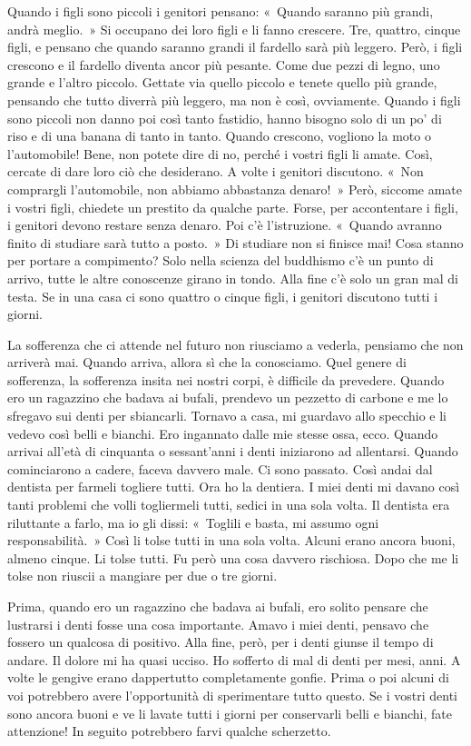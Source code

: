 Quando i figli sono piccoli i genitori pensano: «~Quando saranno più
grandi, andrà meglio.~» Si occupano dei loro figli e li fanno crescere.
Tre, quattro, cinque figli, e pensano che quando saranno grandi il
fardello sarà più leggero. Però, i figli crescono e il fardello diventa
ancor più pesante. Come due pezzi di legno, uno grande e l'altro
piccolo. Gettate via quello piccolo e tenete quello più grande, pensando
che tutto diverrà più leggero, ma non è così, ovviamente. Quando i figli
sono piccoli non danno poi così tanto fastidio, hanno bisogno solo di un
po' di riso e di una banana di tanto in tanto. Quando crescono, vogliono
la moto o l'automobile! Bene, non potete dire di no, perché i vostri
figli li amate. Così, cercate di dare loro ciò che desiderano. A volte i
genitori discutono. «~Non comprargli l'automobile, non abbiamo
abbastanza denaro!~» Però, siccome amate i vostri figli, chiedete un
prestito da qualche parte. Forse, per accontentare i figli, i genitori
devono restare senza denaro. Poi c'è l'istruzione. «~Quando avranno
finito di studiare sarà tutto a posto.~» Di studiare non si finisce mai!
Cosa stanno per portare a compimento? Solo nella scienza del buddhismo
c'è un punto di arrivo, tutte le altre conoscenze girano in tondo. Alla
fine c'è solo un gran mal di testa. Se in una casa ci sono quattro o
cinque figli, i genitori discutono tutti i giorni.

La sofferenza che ci attende nel futuro non riusciamo a vederla,
pensiamo che non arriverà mai. Quando arriva, allora sì che la
conosciamo. Quel genere di sofferenza, la sofferenza insita nei nostri
corpi, è difficile da prevedere. Quando ero un ragazzino che badava ai
bufali, prendevo un pezzetto di carbone e me lo sfregavo sui denti per
sbiancarli. Tornavo a casa, mi guardavo allo specchio e li vedevo così
belli e bianchi. Ero ingannato dalle mie stesse ossa, ecco. Quando
arrivai all'età di cinquanta o sessant'anni i denti iniziarono ad
allentarsi. Quando cominciarono a cadere, faceva davvero male. Ci sono
passato. Così andai dal dentista per farmeli togliere tutti. Ora ho la
dentiera. I miei denti mi davano così tanti problemi che volli
togliermeli tutti, sedici in una sola volta. Il dentista era riluttante
a farlo, ma io gli dissi: «~Toglili e basta, mi assumo ogni
responsabilità.~» Così li tolse tutti in una sola volta. Alcuni erano
ancora buoni, almeno cinque. Li tolse tutti. Fu però una cosa davvero
rischiosa. Dopo che me li tolse non riuscii a mangiare per due o tre
giorni.

Prima, quando ero un ragazzino che badava ai bufali, ero solito pensare
che lustrarsi i denti fosse una cosa importante. Amavo i miei denti,
pensavo che fossero un qualcosa di positivo. Alla fine, però, per i
denti giunse il tempo di andare. Il dolore mi ha quasi ucciso. Ho
sofferto di mal di denti per mesi, anni. A volte le gengive erano
dappertutto completamente gonfie. Prima o poi alcuni di voi potrebbero
avere l'opportunità di sperimentare tutto questo. Se i vostri denti sono
ancora buoni e ve li lavate tutti i giorni per conservarli belli e
bianchi, fate attenzione! In seguito potrebbero farvi qualche
scherzetto.


